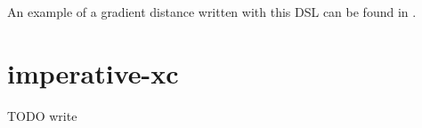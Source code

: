 An example of a gradient distance written with this DSL can be found in .



\section{imperative-xc} \label{chap:state-of-the-art->sec:imperative-xc}
TODO write

